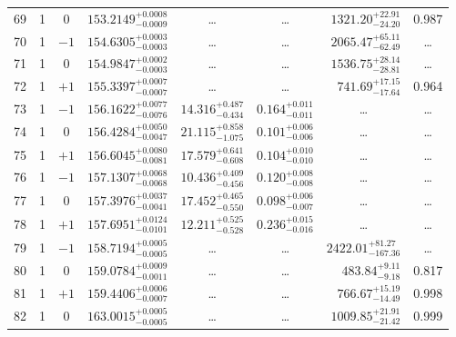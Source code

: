 \begin{table*}[!]
\begin{tabular}{llcrrlrc}
69  & 1 & 0 & $    153.2149_{-      0.0009}^{+      0.0008}$ & \multicolumn{1}{c}{\dots} & \multicolumn{1}{c}{\dots} & $     1321.20_{-       24.20}^{+       22.91}$ & 0.987\\[1pt]
70 & 1 & $-1$ & $    154.6305_{-      0.0003}^{+      0.0003}$ & \multicolumn{1}{c}{\dots} & \multicolumn{1}{c}{\dots} & $     2065.47_{-       62.49}^{+       65.11}$ & \dots \\[1pt]
71 & 1 & 0 & $    154.9847_{-      0.0003}^{+      0.0002}$ & \multicolumn{1}{c}{\dots} & \multicolumn{1}{c}{\dots} & $     1536.75_{-       28.81}^{+       28.14}$ & \dots \\[1pt]
72 & 1 & $+1$ & $    155.3397_{-      0.0007}^{+      0.0007}$ & \multicolumn{1}{c}{\dots} & \multicolumn{1}{c}{\dots} & $      741.69_{-       17.64}^{+       17.15}$ & 0.964\\[1pt]
73 & 1 & $-1$ & $    156.1622_{-      0.0076}^{+      0.0077}$ & $      14.316_{-       0.434}^{+       0.487}$ & $       0.164_{-       0.011}^{+       0.011}$ & \multicolumn{1}{c}{\dots} & \dots \\[1pt]
74 & 1 & 0 & $    156.4284_{-      0.0047}^{+      0.0050}$ & $      21.115_{-       1.075}^{+       0.858}$ & $       0.101_{-       0.006}^{+       0.006}$ & \multicolumn{1}{c}{\dots} & \dots \\[1pt]
75 & 1 & $+1$ & $    156.6045_{-      0.0081}^{+      0.0080}$ & $      17.579_{-       0.608}^{+       0.641}$ & $       0.104_{-       0.010}^{+       0.010}$ & \multicolumn{1}{c}{\dots} & \dots \\[1pt]
76 & 1 & $-1$ & $    157.1307_{-      0.0068}^{+      0.0068}$ & $      10.436_{-       0.456}^{+       0.409}$ & $       0.120_{-       0.008}^{+       0.008}$ & \multicolumn{1}{c}{\dots} & \dots \\[1pt]
77 & 1 & 0 & $    157.3976_{-      0.0041}^{+      0.0037}$ & $      17.452_{-       0.550}^{+       0.465}$ & $       0.098_{-       0.007}^{+       0.006}$ & \multicolumn{1}{c}{\dots} & \dots \\[1pt]
78 & 1 & $+1$ & $    157.6951_{-      0.0101}^{+      0.0124}$ & $      12.211_{-       0.528}^{+       0.525}$ & $       0.236_{-       0.016}^{+       0.015}$ & \multicolumn{1}{c}{\dots} & \dots \\[1pt] 
79 & 1 & $-1$ & $    158.7194_{-      0.0005}^{+      0.0005}$ & \multicolumn{1}{c}{\dots} & \multicolumn{1}{c}{\dots} & $     2422.01_{-      167.36}^{+       81.27}$ & \dots \\[1pt]
80 & 1 & 0 & $    159.0784_{-      0.0011}^{+      0.0009}$ & \multicolumn{1}{c}{\dots} & \multicolumn{1}{c}{\dots} & $      483.84_{-        9.18}^{+        9.11}$ & 0.817\\[1pt]
81 & 1 & $+1$ & $    159.4406_{-      0.0007}^{+      0.0006}$ & \multicolumn{1}{c}{\dots} & \multicolumn{1}{c}{\dots} & $      766.67_{-       14.49}^{+       15.19}$ & 0.998\\[1pt]
82 & 1 & 0 & $    163.0015_{-      0.0005}^{+      0.0005}$ & \multicolumn{1}{c}{\dots} & \multicolumn{1}{c}{\dots} & $     1009.85_{-       21.42}^{+       21.91}$ & 0.999\\[1pt]


\end{tabular}
\end{table*}
